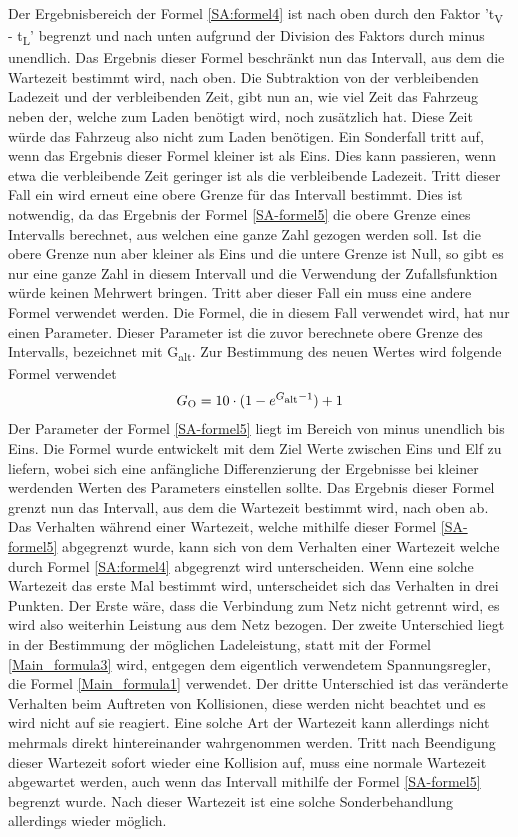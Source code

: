 Der Ergebnisbereich der Formel \ref{SA:formel4} ist nach oben durch den Faktor 't\textsubscript{V} - t\textsubscript{L}' begrenzt und nach unten aufgrund der Division des Faktors durch minus unendlich. Das Ergebnis dieser Formel beschränkt nun das Intervall, aus dem die Wartezeit bestimmt wird, nach oben. Die Subtraktion von der verbleibenden Ladezeit und der verbleibenden Zeit, gibt nun an, wie viel Zeit das Fahrzeug neben der, welche zum Laden benötigt wird, noch zusätzlich hat. Diese Zeit würde das Fahrzeug also nicht zum Laden benötigen. Ein Sonderfall tritt auf, wenn das Ergebnis dieser Formel kleiner ist als Eins. Dies kann passieren, wenn etwa die verbleibende Zeit geringer ist als die verbleibende Ladezeit. Tritt dieser Fall ein wird erneut eine obere Grenze für das Intervall bestimmt. Dies ist notwendig, da das Ergebnis der Formel \ref{SA-formel5} die obere Grenze eines Intervalls berechnet, aus welchen eine ganze Zahl gezogen werden soll. Ist die obere Grenze nun aber kleiner als Eins und die untere Grenze ist Null, so gibt es nur eine ganze Zahl in diesem Intervall und die Verwendung der Zufallsfunktion würde keinen Mehrwert bringen. Tritt aber dieser Fall ein muss eine andere Formel verwendet werden. Die Formel, die in diesem Fall verwendet wird, hat nur einen Parameter. Dieser Parameter ist die zuvor berechnete obere Grenze des Intervalls, bezeichnet mit G\textsubscript{alt}. Zur Bestimmung des neuen Wertes wird folgende Formel verwendet \\
\begin{align}
	G\textsubscript{O} = 10 \cdot (1 - e^{G\textsubscript{alt} - 1}) + 1
	\label{SA-formel5}
\end{align}
Der Parameter der Formel \ref{SA-formel5} liegt im Bereich von minus unendlich bis Eins. Die Formel wurde entwickelt mit dem Ziel Werte zwischen Eins und Elf zu liefern, wobei sich eine anfängliche Differenzierung der Ergebnisse bei kleiner werdenden Werten des Parameters einstellen sollte. Das Ergebnis dieser Formel grenzt nun das Intervall, aus dem die Wartezeit bestimmt wird, nach oben ab. Das Verhalten während einer Wartezeit, welche mithilfe dieser Formel \ref{SA-formel5} abgegrenzt wurde, kann sich von dem Verhalten einer Wartezeit welche durch Formel \ref{SA:formel4} abgegrenzt wird unterscheiden. Wenn eine solche Wartezeit das erste Mal bestimmt wird, unterscheidet sich das Verhalten in drei Punkten. Der Erste wäre, dass die Verbindung zum Netz nicht getrennt wird, es wird also weiterhin Leistung aus dem Netz bezogen. Der zweite Unterschied liegt in der Bestimmung der möglichen Ladeleistung, statt mit der Formel \ref{Main_formula3} wird, entgegen dem eigentlich verwendetem Spannungsregler, die Formel \ref{Main_formula1} verwendet. Der dritte Unterschied ist das veränderte Verhalten beim Auftreten von Kollisionen, diese werden nicht beachtet und es wird nicht auf sie reagiert. Eine solche Art der Wartezeit kann allerdings nicht mehrmals direkt hintereinander wahrgenommen werden. Tritt nach Beendigung dieser Wartezeit sofort wieder eine Kollision auf, muss eine normale Wartezeit abgewartet werden, auch wenn das Intervall mithilfe der Formel \ref{SA-formel5} begrenzt wurde. Nach dieser Wartezeit ist eine solche Sonderbehandlung allerdings wieder möglich.\\
